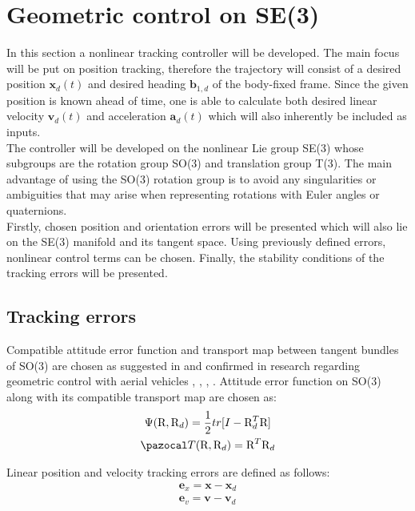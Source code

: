 \section{Geometric control on SE(3)}

In this section a nonlinear tracking controller will be developed. The main focus will be put on position tracking, therefore the trajectory will consist of a desired position $\textbf{x}_d(t)$ and desired heading $\textbf{b}_{1,d}$ of the body-fixed frame. Since the given position is known ahead of time, one is able to calculate both desired linear velocity $\textbf{v}_d(t)$ and acceleration $\textbf{a}_d(t)$ which will also inherently be included as inputs. \\
The controller will be developed on the nonlinear Lie group SE(3) whose subgroups are the rotation group SO(3) and translation group T(3). The main advantage of using the SO(3) rotation group is to avoid any singularities or ambiguities that may arise when representing rotations with Euler angles or quaternions. \\
Firstly, chosen position and orientation errors will be presented which will also lie on the SE(3) manifold and its tangent space. Using previously defined errors, nonlinear control terms can be chosen. Finally, the stability conditions of the tracking errors will be presented.

\subsection{Tracking errors}

Compatible attitude error function and transport map between tangent bundles of SO(3) are chosen as suggested in \cite{bulloBook} and confirmed in research regarding geometric control with aerial vehicles \cite{LeeClanak1}, \cite{LeeClanak2}, \cite{LeeClanak3}, \cite{LeeClanak4}. Attitude error function on SO(3) along with its compatible transport map are chosen as:
\begin{gather}
	\Psi(\text{R}, \text{R}_d) = \frac{1}{2}tr[I - \text{R}_d^T\text{R}] \label{attErr} \\ 
	\Ta(\text{R}, \text{R}_d) = \text{R}^T \text{R}_d \label{transportMap}
\end{gather}

\noindent Linear position and velocity tracking errors are defined as follows:
\begin{gather}
	\textbf{e}_x = \textbf{x} - \textbf{x}_d \\
	\textbf{e}_v = \textbf{v} - \textbf{v}_d \label{linear_error}
\end{gather}

